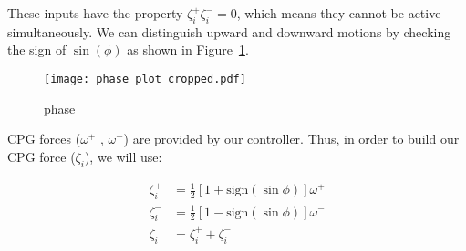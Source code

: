 \documentclass{article}
\begin{document}
These inputs have the property $\zeta_i^+  \zeta_i^- = 0$, which means they cannot be active simultaneously. We can distinguish upward and downward motions by checking the sign of $\sin(\phi)$ as shown in Figure~\ref{fig:phase_plot}.

\begin{figure}[thpb]
	\centering
		\centering
		\texttt{[image: phase\_plot\_cropped.pdf]}
		\centering
		\caption{phase}
		\label{fig:phase_plot}
\end{figure}

CPG forces ($\omega^+$ , $\omega^-$) are provided by our controller. Thus, in order to build our CPG force ($\zeta_i$), we will use: 

\begin{align}\label{eq:spliting}
	\zeta_i^+ &= \frac{1}{2}[1+ \mathrm{sign}(\sin\phi)] \omega^+\\
	\zeta_i^- &= \frac{1}{2}[1- \mathrm{sign}(\sin\phi)] \omega^-\\
	\zeta_i &= \zeta_i^+ + \zeta_i^-
\end{align}
\end{document}
